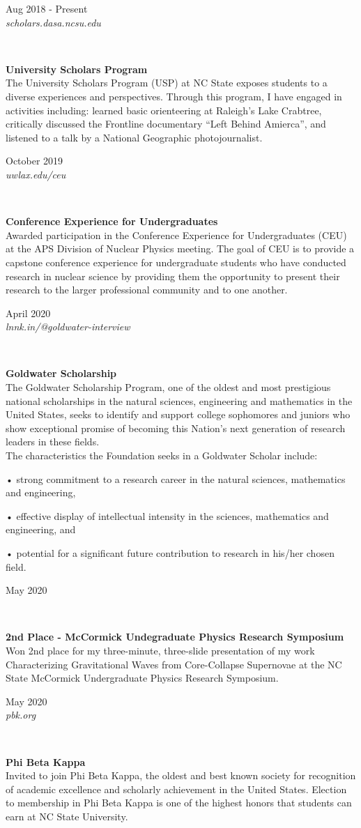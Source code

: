\documentclass[8pt]{article}
\def \tertiarycolor  {airforceblue} %
\def \leftcolwidth{3.05cm}
\newcommand{\cventry}[4]{
    \begin{minipage}[t]{\leftcolwidth} 
        \small{
            \begin{flushright}
                #2\\
                \textcolor{\tertiarycolor}{\textit{#4}}
            \end{flushright}
        }
    \end{minipage} \ \
    \begin{minipage}[t]{\linewidth-\leftcolwidth} \normalsize{\textbf{#1} \\ #3} \end{minipage}
} %
\begin{document}
\cventry{University Scholars Program}{Aug 2018 - Present}{The University Scholars Program (USP) at NC State exposes students to a diverse experiences and perspectives. Through this program, I have engaged in activities including: learned basic orienteering at Raleigh’s Lake Crabtree, critically discussed the Frontline documentary “Left Behind Amierca”, and listened to a talk by a National Geographic photojournalist.}{scholars.dasa.ncsu.edu}

\cventry{Conference Experience for Undergraduates}{October 2019}{Awarded participation in the Conference Experience for Undergraduates (CEU) at the APS Division of Nuclear Physics meeting. The goal of CEU is to provide a capstone conference experience for undergraduate students who have conducted research in nuclear science by providing them the opportunity to present their research to the larger professional community and to one another.}{uwlax.edu/ceu}

\cventry{Goldwater Scholarship}{April 2020}{The Goldwater Scholarship Program, one of the oldest and most prestigious national scholarships in the natural sciences, engineering and mathematics in the United States, seeks to identify and support college sophomores and juniors who show exceptional promise of becoming this Nation’s next generation of research leaders in these fields. \\

The characteristics the Foundation seeks in a Goldwater Scholar include:

    • strong commitment to a research career in the natural sciences, mathematics and engineering,

    • effective display of intellectual intensity in the sciences, mathematics and engineering, and

    • potential for a significant future contribution to research in his/her chosen field.
}{lnnk.in/@goldwater-interview}

\cventry{2nd Place - McCormick Undegraduate Physics Research Symposium}{May 2020}{Won 2nd place for my three-minute, three-slide presentation of my work Characterizing Gravitational Waves from Core-Collapse Supernovae at the NC State McCormick Undergraduate Physics Research Symposium.}{}

\cventry{Phi Beta Kappa}{May 2020}{Invited to join Phi Beta Kappa, the oldest and best known society for recognition of academic excellence and scholarly achievement in the United States. Election to membership in Phi Beta Kappa is one of the highest honors that students can earn at NC State University.}{pbk.org}
\end{document}
